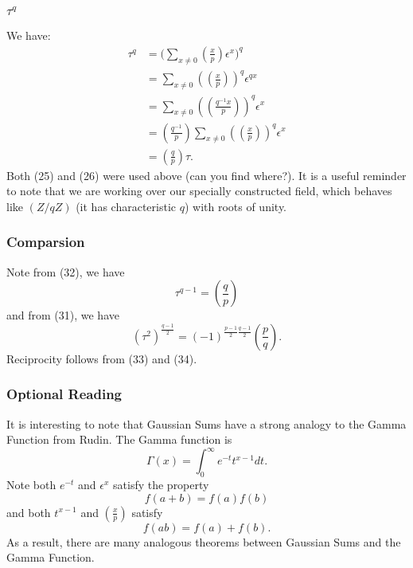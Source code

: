\documentclass{article}
\newcommand{\legendre}[2]{\genfrac{(}{)}{}{}{#1}{#2}}
\begin{document}
\subsubsection{$\tau^{q}$}
We have:
\begin{equation}
    \begin{split}
        \tau^{q} & = \big(\sum_{x \neq 0}\legendre{x}{p}\epsilon^{x}\big)^{q} \\
        & = \sum_{x \neq 0}(\legendre{x}{p})^{q}\epsilon^{qx} \\
        & = \sum_{x \neq 0}(\legendre{q^{-1}x}{p})^{q}\epsilon^{x} \\
        & = \legendre{q^{-1}}{p}\sum_{x \neq 0}(\legendre{x}{p})^{q}\epsilon^{x} \\
        & = \legendre{q}{p}\tau.
    \end{split}
\end{equation}
Both (25) and (26) were used above (can you find where?). It is a useful reminder to note that we are working over our specially constructed field, which behaves like $(Z/qZ)$ (it has characteristic $q$) with roots of unity.

\subsubsection{Comparsion}
Note from (32), we have
\begin{equation}
    \tau^{q-1} = \legendre{q}{p}
\end{equation}
and from (31), we have
\begin{equation}
    (\tau^{2})^{\frac{q-1}{2}} = (-1)^{\frac{p-1}{2}\frac{q-1}{2}}\legendre{p}{q}.
\end{equation}
Reciprocity follows from (33) and (34).

\subsubsection{Optional Reading}
It is interesting to note that Gaussian Sums have a strong analogy to the Gamma Function from Rudin. The Gamma function is
\begin{equation}
    \Gamma(x) = \int_{0}^{\infty}e^{-t}t^{x-1}dt.
\end{equation}
Note both $e^{-t}$ and $\epsilon^{x}$ satisfy the property
\begin{equation}
    f(a+b) = f(a)f(b)
\end{equation}
and both $t^{x-1}$ and $\legendre{x}{p}$ satisfy
\begin{equation}
    f(ab) = f(a) + f(b).
\end{equation}
As a result, there are many analogous theorems between Gaussian Sums and the Gamma Function.
\end{document}
